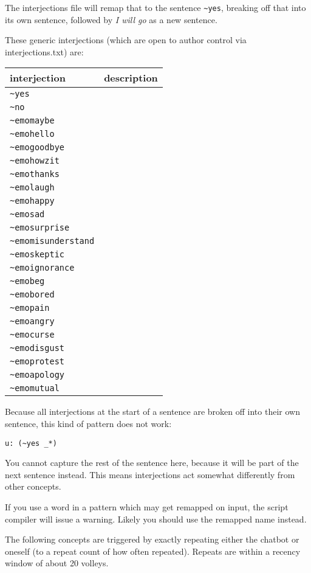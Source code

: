 \documentclass[]{article}
\begin{document}
The interjections file will remap that to the sentence
\texttt{\textasciitilde{}yes}, breaking off that into its own sentence,
followed by \emph{I will go} as a new sentence.

These generic interjections (which are open to author control via
interjections.txt) are:

\begin{longtable}[]{@{}ll@{}}
\toprule
interjection & description\tabularnewline
\midrule
\endhead
\texttt{\textasciitilde{}yes} &\tabularnewline
\texttt{\textasciitilde{}no} &\tabularnewline
\texttt{\textasciitilde{}emomaybe} &\tabularnewline
\texttt{\textasciitilde{}emohello} &\tabularnewline
\texttt{\textasciitilde{}emogoodbye} &\tabularnewline
\texttt{\textasciitilde{}emohowzit} &\tabularnewline
\texttt{\textasciitilde{}emothanks} &\tabularnewline
\texttt{\textasciitilde{}emolaugh} &\tabularnewline
\texttt{\textasciitilde{}emohappy} &\tabularnewline
\texttt{\textasciitilde{}emosad} &\tabularnewline
\texttt{\textasciitilde{}emosurprise} &\tabularnewline
\texttt{\textasciitilde{}emomisunderstand} &\tabularnewline
\texttt{\textasciitilde{}emoskeptic} &\tabularnewline
\texttt{\textasciitilde{}emoignorance} &\tabularnewline
\texttt{\textasciitilde{}emobeg} &\tabularnewline
\texttt{\textasciitilde{}emobored} &\tabularnewline
\texttt{\textasciitilde{}emopain} &\tabularnewline
\texttt{\textasciitilde{}emoangry} &\tabularnewline
\texttt{\textasciitilde{}emocurse} &\tabularnewline
\texttt{\textasciitilde{}emodisgust} &\tabularnewline
\texttt{\textasciitilde{}emoprotest} &\tabularnewline
\texttt{\textasciitilde{}emoapology} &\tabularnewline
\texttt{\textasciitilde{}emomutual} &\tabularnewline
\bottomrule
\end{longtable}

Because all interjections at the start of a sentence are broken off into
their own sentence, this kind of pattern does not work:

\begin{verbatim}
u: (~yes _*)
\end{verbatim}

You cannot capture the rest of the sentence here, because it will be
part of the next sentence instead. This means interjections act somewhat
differently from other concepts.

If you use a word in a pattern which may get remapped on input, the
script compiler will issue a warning. Likely you should use the remapped
name instead.

The following concepts are triggered by exactly repeating either the
chatbot or oneself (to a repeat count of how often repeated). Repeats
are within a recency window of about 20 volleys.
\end{document}
